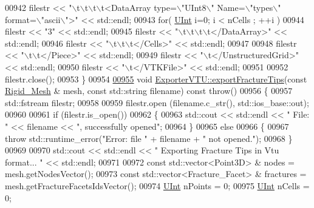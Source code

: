 \begin{DoxyCode}
00942     filestr << \textcolor{stringliteral}{"\(\backslash\)t\(\backslash\)t\(\backslash\)t\(\backslash\)t<DataArray type=\(\backslash\)"UInt8\(\backslash\)" Name=\(\backslash\)"types\(\backslash\)" format=\(\backslash\)"ascii\(\backslash\)">"} << std::endl;
00943     \textcolor{keywordflow}{for}( \hyperlink{namespaceFVCode3D_a4bf7e328c75d0fd504050d040ebe9eda}{UInt} i=0; i < nCells ; ++i )
00944         filestr << \textcolor{stringliteral}{"3"} << std::endl;
00945     filestr << \textcolor{stringliteral}{"\(\backslash\)t\(\backslash\)t\(\backslash\)t\(\backslash\)t</DataArray>"} << std::endl;
00946     filestr << \textcolor{stringliteral}{"\(\backslash\)t\(\backslash\)t\(\backslash\)t</Cells>"} << std::endl;
00947 
00948     filestr << \textcolor{stringliteral}{"\(\backslash\)t\(\backslash\)t</Piece>"} << std::endl;
00949     filestr << \textcolor{stringliteral}{"\(\backslash\)t</UnstructuredGrid>"} << std::endl;
00950     filestr << \textcolor{stringliteral}{"\(\backslash\)t</VTKFile>"} << std::endl;
00951 
00952     filestr.close();
00953 \}
00954 
\hypertarget{ExportVTU_8cpp_source.tex_l00955}{}\hyperlink{classFVCode3D_1_1ExporterVTU_a95853064ccbdab9ab24b3aa6f67ff19c}{00955} \textcolor{keywordtype}{void} \hyperlink{classFVCode3D_1_1ExporterVTU_a95853064ccbdab9ab24b3aa6f67ff19c}{ExporterVTU::exportFractureTips}(\textcolor{keyword}{const} 
      \hyperlink{classFVCode3D_1_1Rigid__Mesh}{Rigid\_Mesh} & mesh, \textcolor{keyword}{const} std::string filename) \textcolor{keyword}{const} \textcolor{keywordflow}{throw}()
00956 \{
00957     std::fstream filestr;
00958 
00959     filestr.open (filename.c\_str(), std::ios\_base::out);
00960 
00961     \textcolor{keywordflow}{if} (filestr.is\_open())
00962     \{
00963         std::cout << std::endl << \textcolor{stringliteral}{" File: "} << filename << \textcolor{stringliteral}{", successfully opened"};
00964     \}
00965     \textcolor{keywordflow}{else}
00966     \{
00967         \textcolor{keywordflow}{throw} std::runtime\_error(\textcolor{stringliteral}{"Error: file "} + filename + \textcolor{stringliteral}{" not opened."});
00968     \}
00969 
00970     std::cout << std::endl << \textcolor{stringliteral}{" Exporting Fracture Tips in Vtu format... "} << std::endl;
00971 
00972     \textcolor{keyword}{const} std::vector<Point3D> & nodes = mesh.getNodesVector();
00973     \textcolor{keyword}{const} std::vector<Fracture\_Facet> & fractures = mesh.getFractureFacetsIdsVector();
00974     \hyperlink{namespaceFVCode3D_a4bf7e328c75d0fd504050d040ebe9eda}{UInt} nPoints = 0;
00975     \hyperlink{namespaceFVCode3D_a4bf7e328c75d0fd504050d040ebe9eda}{UInt} nCells = 0;

\end{DoxyCode}
